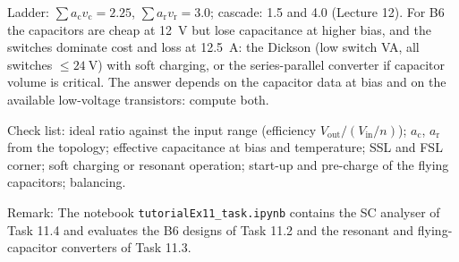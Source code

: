 
\begin{solutionblock}
	Ladder: $\sum a_\mathrm{c}v_\mathrm{c}=2.25$, $\sum a_\mathrm{r}v_\mathrm{r}=3.0$; cascade: 1.5 and 4.0 (Lecture 12). For B6 the capacitors are cheap at \SI{12}{\volt} but lose capacitance at higher bias, and the switches dominate cost and loss at \SI{12.5}{\ampere}: the Dickson (low switch VA, all switches $\leq\SI{24}{\volt}$) with soft charging, or the series-parallel converter if capacitor volume is critical. The answer depends on the capacitor data at bias and on the available low-voltage transistors: compute both.
\end{solutionblock}




\begin{solutionblock}
	Check list: ideal ratio against the input range (efficiency $V_\mathrm{out}/(V_\mathrm{in}/n)$); $a_\mathrm{c}$, $a_\mathrm{r}$ from the topology; effective capacitance at bias and temperature; SSL and FSL corner; soft charging or resonant operation; start-up and pre-charge of the flying capacitors; balancing.
\end{solutionblock}

\vspace{0.5cm}
Remark: The notebook \texttt{tutorialEx11\_task.ipynb} contains the SC analyser of Task 11.4 and evaluates the B6 designs of Task 11.2 and the resonant and flying-capacitor converters of Task 11.3.
